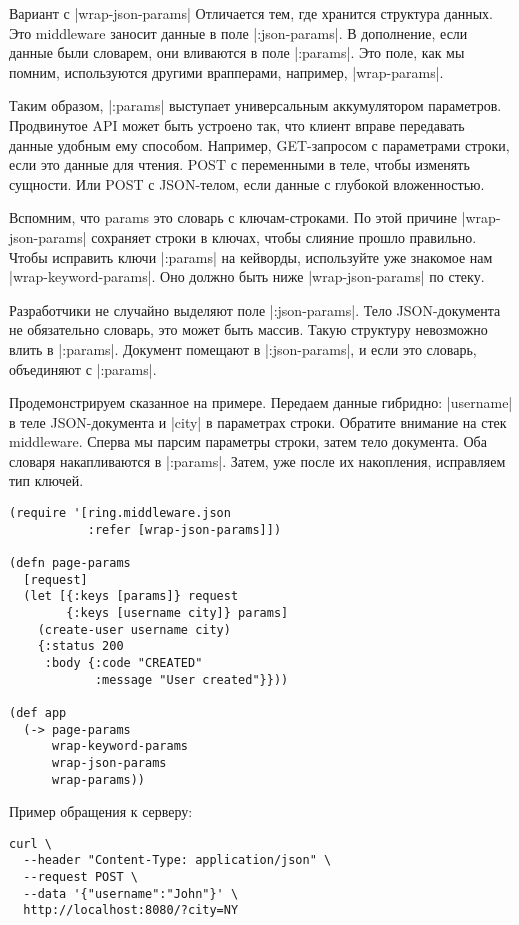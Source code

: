 Вариант с \spverb|wrap-json-params| Отличается тем, где хранится структура данных. Это
middleware заносит данные в поле \spverb|:json-params|. В дополнение, если данные были
словарем, они вливаются в поле \spverb|:params|. Это поле, как мы помним, используются
другими врапперами, например, \spverb|wrap-params|.

Таким образом, \spverb|:params| выступает универсальным аккумулятором
параметров. Продвинутое API может быть устроено так, что клиент вправе
передавать данные удобным ему способом. Например, GET-запросом с параметрами
строки, если это данные для чтения. POST с переменными в теле, чтобы изменять
сущности. Или POST с JSON-телом, если данные с глубокой вложенностью.

Вспомним, что params это словарь с ключам-строками. По этой причине
\spverb|wrap-json-params| сохраняет строки в ключах, чтобы слияние прошло
правильно. Чтобы исправить ключи \spverb|:params| на кейворды, используйте уже знакомое
нам \spverb|wrap-keyword-params|. Оно должно быть ниже \spverb|wrap-json-params| по стеку.

Разработчики не случайно выделяют поле \spverb|:json-params|. Тело JSON-документа не
обязательно словарь, это может быть массив. Такую структуру невозможно влить в
\spverb|:params|. Документ помещают в \spverb|:json-params|, и если это словарь, объединяют с
\spverb|:params|.

Продемонстрируем сказанное на примере. Передаем данные гибридно: \spverb|username| в
теле JSON-документа и \spverb|city| в параметрах строки. Обратите внимание на стек
middleware. Сперва мы парсим параметры строки, затем тело документа. Оба словаря
накапливаются в \spverb|:params|. Затем, уже после их накопления, исправляем тип
ключей.

\begin{verbatim}
(require '[ring.middleware.json
           :refer [wrap-json-params]])

(defn page-params
  [request]
  (let [{:keys [params]} request
        {:keys [username city]} params]
    (create-user username city)
    {:status 200
     :body {:code "CREATED"
            :message "User created"}}))

(def app
  (-> page-params
      wrap-keyword-params
      wrap-json-params
      wrap-params))
\end{verbatim}

Пример обращения к серверу:

\begin{verbatim}
curl \
  --header "Content-Type: application/json" \
  --request POST \
  --data '{"username":"John"}' \
  http://localhost:8080/?city=NY
\end{verbatim}

